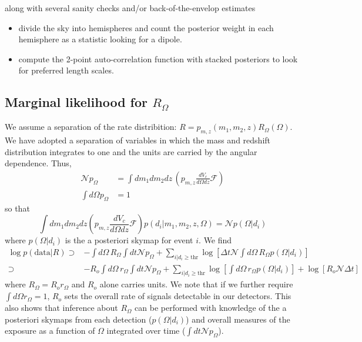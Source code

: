 \documentclass{article}
\begin{document}
along with several sanity checks and/or back-of-the-envelop estimates
\begin{itemize}
    \item divide the sky into hemispheres and count the posterior weight in each hemisphere as a statistic looking for a dipole.
    \item compute the 2-point auto-correlation function with stacked posteriors to look for preferred length scales.
\end{itemize}


\subsection*{Marginal likelihood for $R_\Omega$}

We assume a separation of the rate distribition: $R = p_{m,z}(m_1, m_2, z) R_\Omega(\Omega)$.
We have adopted a separation of variables in which the mass and redshift distribution integrates to one and the units are carried by the angular dependence.
Thus,
\begin{align}
    \mathcal{N} p_\Omega & = \int dm_1 dm_2 dz\, \left(p_{m,z} \frac{dV_c}{d\Omega dz} \mathcal{F}\right) \\
    \int d\Omega p_\Omega & = 1
\end{align}
so that
\begin{equation}
    \int dm_1 dm_2 dz \left( p_{m,z}\frac{dV_c}{d\Omega dz} \mathcal{F}\right) p(d_i|m_1, m_2, z, \Omega) = \mathcal{N} p(\Omega|d_i)
\end{equation}
where $p(\Omega|d_i)$ is the a posteriori skymap for event $i$.
We find
\begin{align}
    \log p(\mathrm{data}|R) \supset & - \int d\Omega\, R_\Omega \int dt \mathcal{N} p_\Omega + \sum\limits_{i|d_i\geq\mathrm{thr}} \log \left[ \Delta t \mathcal{N} \int d\Omega\, R_\Omega p(\Omega|d_i) \right] \nonumber \\
                            \supset & - R_o \int d\Omega\, r_\Omega \int dt \mathcal{N} p_\Omega + \sum\limits_{i|d_i\geq\mathrm{thr}} \log \left[ \int d\Omega\, r_\Omega p(\Omega|d_i) \right] + \log\left[ R_o \mathcal{N} \Delta t \right]
\end{align}
where $R_\Omega = R_o r_\Omega$ and $R_o$ alone carries units.
We note that if we further require $\int d\Omega r_\Omega = 1$, $R_o$ sets the overall rate of signals detectable in our detectors.
This also shows that inference about $R_\Omega$ can be performed with knowledge of the a posteriori skymaps from each detection ($p(\Omega|d_i)$) and overall measures of the exposure as a function of $\Omega$ integrated over time ($\int dt \mathcal{N} p_\Omega$).
\end{document}
